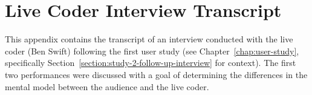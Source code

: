 \begin{center}
\end{center}

\chapter{Live Coder Interview Transcript}
\label{appendix:live-coder-interview-transcript}

This appendix contains the transcript of an interview conducted with the live coder (Ben Swift) following the first user study (see Chapter~\ref{chap:user-study}, specifically Section~\ref{section:study-2-follow-up-interview} for context). The first two performances were discussed with a goal of determining the differences in the mental model between the audience and the live coder.



